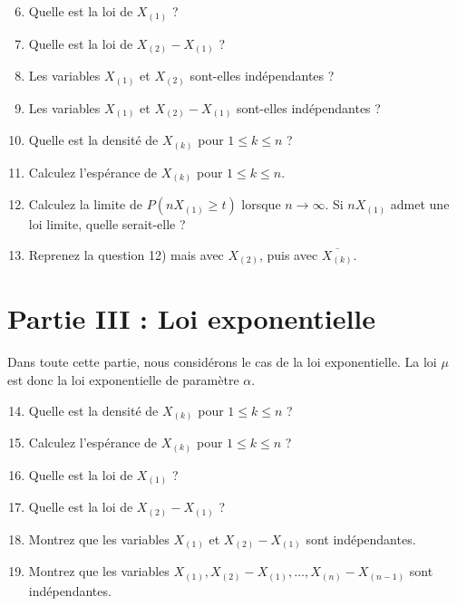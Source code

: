 \documentclass[12pt,a4paper]{article}
\begin{document}
\begin{enumerate}
  \setcounter{enumi}{5}
  \item Quelle est la loi de $X_{(1)}$ ?
  \item Quelle est la loi de $X_{(2)} - X_{(1)}$ ?
  \item Les variables $X_{(1)}$ et $X_{(2)}$ sont-elles indépendantes ?
  \item Les variables $X_{(1)}$ et $X_{(2)} - X_{(1)}$ sont-elles indépendantes ?
  \item Quelle est la densité de $X_{(k)}$ pour $1 \leq k \leq n$ ?
  \item Calculez l’espérance de $X_{(k)}$ pour $1 \leq k \leq n$.
  \item Calculez la limite de $P(nX_{(1)} \geq t)$ lorsque $n \to \infty$. 
  Si $nX_{(1)}$ admet une loi limite, quelle serait-elle ?
  \item Reprenez la question 12) mais avec $X_{(2)}$, puis avec $\overline{X_{(k)}}$.
\end{enumerate}

\section*{Partie III : Loi exponentielle}

Dans toute cette partie, nous considérons le cas de la loi exponentielle. 
La loi $\mu$ est donc la loi exponentielle de paramètre $\alpha$.

\begin{enumerate}
  \setcounter{enumi}{13}
  \item Quelle est la densité de $X_{(k)}$ pour $1 \leq k \leq n$ ?
  \item Calculez l’espérance de $X_{(k)}$ pour $1 \leq k \leq n$ ?
  \item Quelle est la loi de $X_{(1)}$ ?
  \item Quelle est la loi de $X_{(2)} - X_{(1)}$ ?
  \item Montrez que les variables $X_{(1)}$ et $X_{(2)} - X_{(1)}$ sont indépendantes.
  \item Montrez que les variables $X_{(1)}, X_{(2)} - X_{(1)}, \dots, X_{(n)} - X_{(n-1)}$ 
        sont indépendantes.
\end{enumerate}
\end{document}
